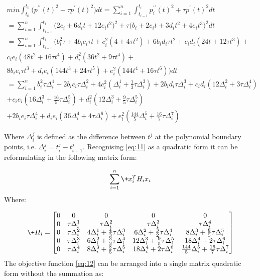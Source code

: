 \documentclass{article}
\begin{document}
\begin{eqnarray}
    \label{eq:11}
    \nonumber
    min \int_{t_0}^{t_n} \bigl( p^{\prime\prime}(t)^2 + \tau p^{\prime}(t)^2 \bigr) dt 
    = \sum_{i=1}^{n}\int_{t_{i - 1}}^{t_i}p^{\prime\prime}_i(t)^2 + \tau p^{\prime}(t)^2 dt \\
    \nonumber
    =\sum_{i=1}^{n}\int_{t_{i - 1}}^{t_i} \bigl( 2 c_i + 6 d_i t + 12 e_i t^2\bigr)^2 
    + \tau \bigl( b_i + 2 c_i t + 3 d_i t^2 + 4 e_i t^3 \bigr)^2 dt \\
    \nonumber
    =\sum_{i=1}^{n}\int_{t_{i - 1}}^{t_i} \biggl( b_i^2\tau + 4 b_i c_i \tau t + c_i^2(4 + 4 \tau t^2) 
    + 6 b_i d_i \tau t^2 + c_i d_i (24 t + 12 \tau t^3) + \\
    \nonumber
    c_i e_i (48 t^2 + 16 \tau t^4) + d_i^2 (36 t^2 + 9 \tau t^4) + \\
    \nonumber
    8 b_i e_i \tau t^3 + d_i e_i (144 t^3 + 24 \tau t^5) + 
     e_i^2 (144 t^4 + 16 \tau t^6) \biggr) dt \\
    \nonumber
    =\sum_{i=1}^{n} b_i^2 \tau \Delta_i^1 + 2 b_i c_i \tau \Delta_i^2  + 4 c_i^2 (\Delta_i^1 + \frac{1}{3} \tau \Delta_i^3  ) 
    + 2 b_i d_i \tau \Delta_i^3 + c_i d_i (12 \Delta_i^2 + 3 \tau \Delta_i^4 ) \\
    \nonumber
    + c_i e_i ( 16 \Delta_i^3 + \frac{16}{5} \tau \Delta_i^5 ) + d_i^2 (12 \Delta_i^3 + 
    \frac{9}{5} \tau \Delta_i^5 ) \\
    + 2 b_i e_i \tau \Delta_i^4 + d_i e_i ( 36 \Delta_i^4 + 4 \tau \Delta_i^6 ) + 
    e_i^2 ( \frac{144}{5} \Delta_i^5 + \frac{16}{7} \tau \Delta_i^7 )
\end{eqnarray}

Where $\Delta_i^j$ is defined as the difference between $t^j$ at the polynomial boundary points, 
i.e. $\Delta_i^j = t_i^j - t_{i-1}^j$.
Recognising \ref{eq:11} as a quadratic form it can be reformulating in the following matrix form:


\begin{equation}
    \label{eq:12}
    \sum_{i=1}^{n}\+{x_i^TH_ix_i}
\end{equation}
Where:

\begin{equation*}
    \+{H_i} = \begin{bmatrix}
        0 & 0 & 0 & 0 & 0 \\
        0 & \tau \Delta_i^1 & \tau \Delta_i^2 & \tau \Delta_i^3 & \tau \Delta_i^4 \\
        0 & \tau \Delta_i^2 & 4 \Delta_i^1 + \frac{4}{3} \tau \Delta_i^3 & 6 \Delta_i^2 + \frac{3}{2} \tau \Delta_i^4 & 8 \Delta_i^3 + \frac{8}{5} \tau \Delta_i^5 \\
        0 & \tau \Delta_i^3 & 6 \Delta_i^2 + \frac{3}{2} \tau \Delta_i^4 & 12 \Delta_i^3 + \frac{9}{5} \tau \Delta_i^5 & 18 \Delta_i^4 + 2 \tau \Delta_i^6 \\
        0 & \tau \Delta_i^4 & 8 \Delta_i^3 + \frac{8}{5} \tau \Delta_i^5 & 18 \Delta_i^4 + 2 \tau \Delta_i^6 & \frac{144}{5} \Delta_i^5 + \frac{16}{7} \tau \Delta_i^7
    \end{bmatrix}
\end{equation*}
The objective function \ref{eq:12} can be arranged into a single matrix quadratic form without
the summation as:
\end{document}
